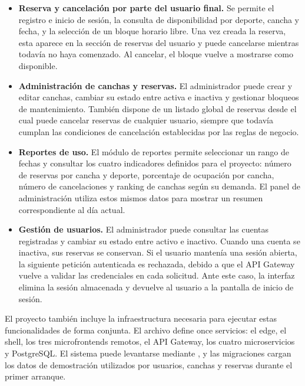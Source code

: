 \begin{itemize}
    \item \textbf{Reserva y cancelación por parte del usuario final.}
    Se permite el registro e inicio de sesión, la consulta de disponibilidad
    por deporte, cancha y fecha, y la selección de un bloque horario libre.
    Una vez creada la reserva, esta aparece en la sección de reservas del
    usuario y puede cancelarse mientras todavía no haya comenzado. Al cancelar,
    el bloque vuelve a mostrarse como disponible.

    \item \textbf{Administración de canchas y reservas.}
    El administrador puede crear y editar canchas, cambiar su estado entre
    activa e inactiva y gestionar bloqueos de mantenimiento. También dispone
    de un listado global de reservas desde el cual puede cancelar reservas de
    cualquier usuario, siempre que todavía cumplan las condiciones de
    cancelación establecidas por las reglas de negocio.

    \item \textbf{Reportes de uso.}
    El módulo de reportes permite seleccionar un rango de fechas y consultar
    los cuatro indicadores definidos para el proyecto: número de reservas por
    cancha y deporte, porcentaje de ocupación por cancha, número de
    cancelaciones y ranking de canchas según su demanda. El panel de
    administración utiliza estos mismos datos para mostrar un resumen
    correspondiente al día actual.

    \item \textbf{Gestión de usuarios.}
    El administrador puede consultar las cuentas registradas y cambiar su
    estado entre activo e inactivo. Cuando una cuenta se inactiva, sus reservas
    se conservan. Si el usuario mantenía una sesión abierta, la siguiente
    petición autenticada es rechazada, debido a que el API Gateway vuelve a
    validar las credenciales en cada solicitud. Ante este caso, la interfaz
    elimina la sesión almacenada y devuelve al usuario a la pantalla de inicio
    de sesión.
\end{itemize}

El proyecto también incluye la infraestructura necesaria para ejecutar estas
funcionalidades de forma conjunta. El archivo  define
once servicios: el edge, el shell, los tres microfrontends remotos, el API
Gateway, los cuatro microservicios y PostgreSQL. El sistema puede levantarse
mediante , y las migraciones cargan los datos de
demostración utilizados por usuarios, canchas y reservas durante el primer
arranque.

